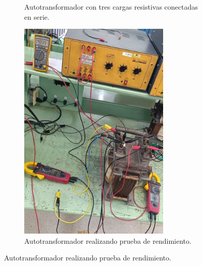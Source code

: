 \begin{figure}[ht!]
\begin{subfigure}{0.5\textwidth}
        \caption{Autotransformador con tres cargas resistivas conectadas en serie.}
        \label{fig:AutoR1}  
    \end{subfigure}
    \label{fig:dos-imagenes}
    \hfill
    \begin{subfigure}{0.5\textwidth} %
        \centering
        \includegraphics[width=0.8\textwidth]{fot/prac4_rendimiento.jpg} %
        \caption{Autotransformador realizando prueba de rendimiento.}
        \label{fig:Autorendimiento}
    \end{subfigure}
\end{figure}